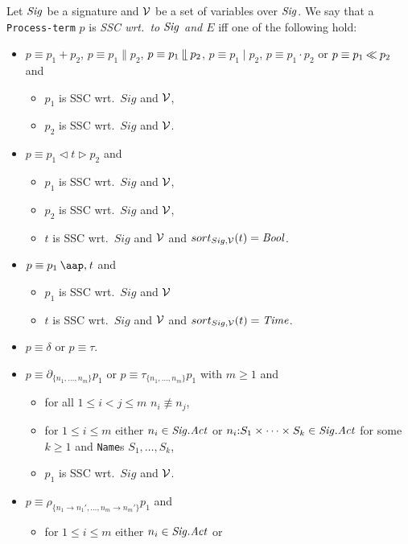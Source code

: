 \documentclass[twoside,fleqn,a4paper,dvips]{article}
\newcommand{\Sig}{\nm{Sig}}
\newcommand{\NV}{{\cal V}}
\begin{document}
\begin{defn}
Let $\Sig$ be a signature and $\NV$ be a set of variables over $\Sig$.
We say that a {\tt Process-term} $p$ is {\it SSC wrt.\ to $\Sig$ and
$E$} iff one of the following hold:
\begin{itemize}
\item
$p\equiv p_1+p_2$, 
$p\equiv p_1\parallel p_2$, $p\equiv p_1\mathbin{\mathrel{\llfloor}} p_2$, $p\equiv p_1\mid
p_2$,
$p\equiv p_1 {\cdot} p_2$ or $p\equiv p_1\mathbin{\ll} p_2$ and
\begin{itemize}
\item
$p_1$ is SSC wrt.\ $Sig$ and $\NV$,
\item
$p_2$ is SSC wrt.\ $Sig$ and $\NV$.
\end{itemize}
\item
$p\equiv p_1\triangleleft t \triangleright p_2$ and
\begin{itemize}
\item
$p_1$ is SSC wrt.\ $Sig$ and $\NV$,
\item
$p_2$ is SSC wrt.\ $Sig$ and $\NV$,
\item
$t$ is SSC wrt.\ $Sig$ and $\NV$ and $sort_{Sig,\NV}(t)=\Bool$.
\end{itemize}
\item
$p\equiv p_1\at{t}$ and 
\begin{itemize}
\item
$p_1$ is SSC wrt.\ $Sig$ and $\NV$
\item
$t$ is SSC wrt.\ $Sig$ and $\NV$ and $sort_{Sig,\NV}(t)=\Time$.
\end{itemize}
\item
$p\equiv \delta$ or $p\equiv\tau$.
\item
$p\equiv\partial_{\{n_1,\ldots,n_m\}}p_1$ or
$p\equiv \tau_{\{n_1,\ldots,n_m\}}p_1$ with $m\geq 1$ and
\begin{itemize}
\item
for all $1\leq i< j \leq m$ $n_i\not\equiv n_j$,
\item
for $1\leq i\leq m$ either $n_i\in \Sig.\Act$ or
$n_i\ap S_1\times \cdots\times S_k\in
\Sig.\Act$ for some $k\geq 1$ and {\tt Name}s $S_1,\ldots,S_k$,
\item
$p_1$ is SSC wrt.\ $Sig$ and $\NV$.
\end{itemize}
\item
$p\equiv\rho_{\{n_1\rightarrow n_1',\ldots,n_m\rightarrow
n_m'\}}p_1$ and
\begin{itemize}
\item
for $1\leq i\leq m$ either $n_i\in \Sig.\Act$ or

\end{itemize}
\end{itemize}
\end{defn}
\end{document}
